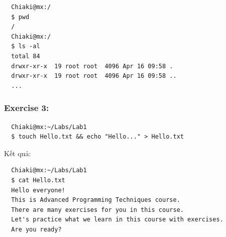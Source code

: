 \documentclass{article}
\begin{document}
\begin{verbatim}
  Chiaki@mx:/                                                                                                                                                                                                    
  $ pwd                                                                                                                                                                                                          
  /     
  Chiaki@mx:/                                                                                                                                                                                                    
  $ ls -al                                                                                                                                                                                                       
  total 84                                                                                                                                                                                                       
  drwxr-xr-x  19 root root  4096 Apr 16 09:58 .                                                                                                                                                                  
  drwxr-xr-x  19 root root  4096 Apr 16 09:58 ..  
  ...       
\end{verbatim}
\subsubsection{Exercise 3:}
\begin{verbatim}
  Chiaki@mx:~/Labs/Lab1                                                                                                                                                                                          
  $ touch Hello.txt && echo "Hello..." > Hello.txt 
\end{verbatim}
Kết quả:
\begin{verbatim}
  Chiaki@mx:~/Labs/Lab1                                                                                                                                                                                          
  $ cat Hello.txt                                                                                                                                                                                                
  Hello everyone!                                                                                                                                                                                                
  This is Advanced Programming Techniques course.                                                                                                                                                                
  There are many exercises for you in this course.                                                                                                                                                               
  Let's practice what we learn in this course with exercises.                                                                                                                                                    
  Are you ready? 
\end{verbatim}
\end{document}
